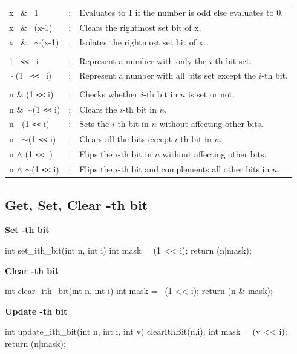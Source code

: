 \begin{tabular}{lll}
   x \ \& \ 1 & : &
   Evaluates to 1 if the number is odd else evaluates to 0.
   \\
   x \ \& \ (x-1) & : & Clears the rightmost set bit of x.
   \\
   x \ \& \ $\sim$(x-1) & : &
   Isolates the rightmost set bit of x.
   \\
   \\
   1 \ \texttt{<<} \ i & : & Represent a number with only the $i$-th bit set.
   \\
   $\sim$(1 \ \texttt{<<} \ i) & : & Represent a number with all bits set except the $i$-th bit.
   \\
   \\
   n \& (1 \texttt{<<} i) & : & Checks whether $i$-th bit  in $n$ is set or not.
   \\
   n \& $\sim$(1 \texttt{<<} i) & : & Clears the $i$-th bit in $n$.
   \\
   n | (1 \texttt{<<} i) & : & Sets the $i$-th bit  in $n$ without affecting other bits.
   \\
   n | $\sim$(1 \texttt{<<} i) & : & Clears all the bits except $i$-th bit in $n$.
   \\
   n $\wedge$ (1 \texttt{<<} i) & : & Flips the $i$-th bit in $n$ without affecting other bits.
   \\
   n $\wedge$ $\sim$(1 \texttt{<<} i) & : & Flips the $i$-th bit and complements all other bits in $n$.
   \\
\end{tabular}

\pagebreak
\subsection{Get, Set, Clear -th bit}
\textbf{Set -th bit}
\begin{code}[language=C++]
   int set_ith_bit(int n, int i){
      int mask = (1 << i);
      return (n|mask);
   }
\end{code}


\textbf{Clear -th bit}
\begin{code}[language=C++]
   int clear_ith_bit(int n, int i){
      int mask = ~(1 << i);
      return (n & mask);
   }
\end{code}


\textbf{Update -th bit}
\begin{code}[language=C++]
   int update_ith_bit(int n, int i, int v){
      clearIthBit(n,i);
      int mask = (v << i);
      return (n|mask);
   }
\end{code}


